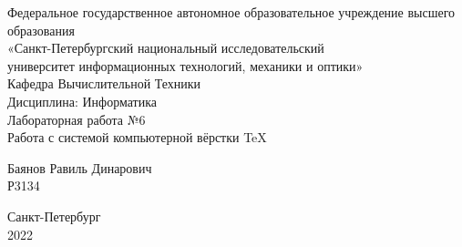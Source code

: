\begin{center}
Федеральное государственное автономное образовательное учреждение высшего  \\
образования \\
«Санкт-Петербургский национальный исследовательский \\
университет информационных технологий, механики и    оптики»\\
\vspace{1cm}
Кафедра Вычислительной Техники \\
Дисциплина: Информатика \\ \vspace{5cm}
Лабораторная работа №6 \\
Работа с системой компьютерной вёрстки \TeX \vspace{5cm}
\end{center}
\begin{flushright}
Баянов Равиль Динарович \\
Р3134 \\
\end{flushright}
\null\vfill
\begin{center}
Санкт-Петербург \\ 
2022
\end{center}